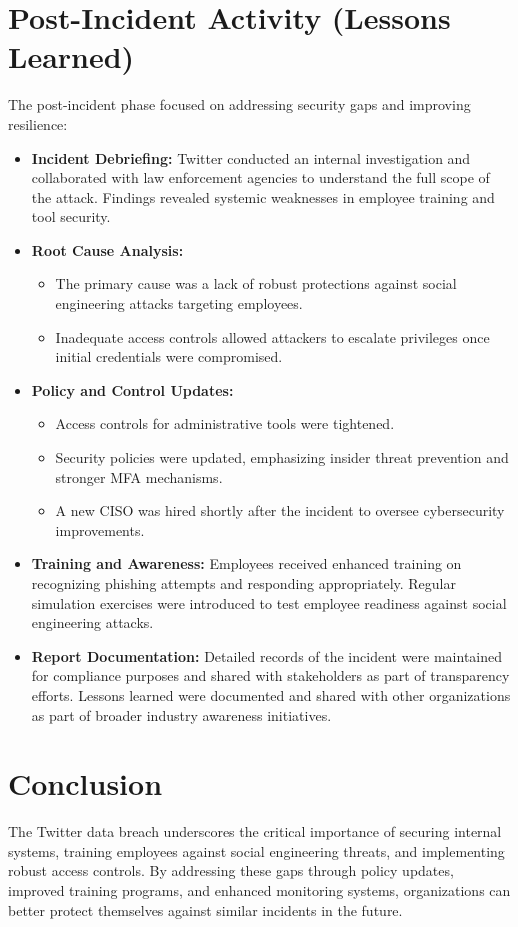 \documentclass[11pt]{book}
\begin{document}
\section{Post-Incident Activity (Lessons Learned)}
The post-incident phase focused on addressing security gaps and improving resilience:
\begin{itemize}
    \item \textbf{Incident Debriefing:} Twitter conducted an internal investigation and collaborated with law enforcement agencies to understand the full scope of the attack. Findings revealed systemic weaknesses in employee training and tool security.
    \item \textbf{Root Cause Analysis:}
    \begin{itemize}
        \item The primary cause was a lack of robust protections against social engineering attacks targeting employees.
        \item Inadequate access controls allowed attackers to escalate privileges once initial credentials were compromised.
    \end{itemize}
    \item \textbf{Policy and Control Updates:}
    \begin{itemize}
        \item Access controls for administrative tools were tightened.
        \item Security policies were updated, emphasizing insider threat prevention and stronger MFA mechanisms.
        \item A new CISO was hired shortly after the incident to oversee cybersecurity improvements.
    \end{itemize}
    \item \textbf{Training and Awareness:} Employees received enhanced training on recognizing phishing attempts and responding appropriately. Regular simulation exercises were introduced to test employee readiness against social engineering attacks.
    \item \textbf{Report Documentation:} Detailed records of the incident were maintained for compliance purposes and shared with stakeholders as part of transparency efforts. Lessons learned were documented and shared with other organizations as part of broader industry awareness initiatives.
\end{itemize}

\section*{Conclusion}
The Twitter data breach underscores the critical importance of securing internal systems, training employees against social engineering threats, and implementing robust access controls. By addressing these gaps through policy updates, improved training programs, and enhanced monitoring systems, organizations can better protect themselves against similar incidents in the future.
\end{document}
